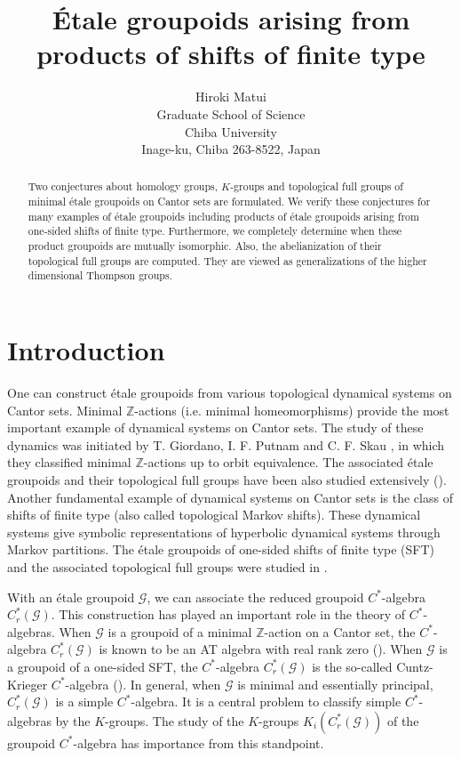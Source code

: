 \documentclass[11pt]{article}
\title{\'Etale groupoids arising from \\
products of shifts of finite type}
\author{Hiroki Matui \\
Graduate School of Science \\
Chiba University \\
Inage-ku, Chiba 263-8522, Japan}
\date{}
\theoremstyle{definition}
\numberwithin{equation}{section}
\newcommand{\G}{\mathcal{G}}
\newcommand{\Z}{\mathbb{Z}}
\begin{document}
\maketitle

\begin{abstract}
Two conjectures about homology groups, $K$-groups 
and topological full groups of minimal \'etale groupoids on Cantor sets 
are formulated. 
We verify these conjectures for many examples of \'etale groupoids 
including products of \'etale groupoids 
arising from one-sided shifts of finite type. 
Furthermore, 
we completely determine when these product groupoids are mutually isomorphic. 
Also, the abelianization of their topological full groups are computed. 
They are viewed as generalizations of the higher dimensional Thompson groups. 
\end{abstract}




\section{Introduction}

One can construct \'etale groupoids 
from various topological dynamical systems on Cantor sets. 
Minimal $\Z$-actions (i.e. minimal homeomorphisms) provide 
the most important example of dynamical systems on Cantor sets. 
The study of these dynamics was initiated 
by T. Giordano, I. F. Putnam and C. F. Skau \cite{GPS95crelle}, 
in which they classified minimal $\Z$-actions up to orbit equivalence. 
The associated \'etale groupoids and their topological full groups 
have been also studied extensively (\cite{GPS99Israel,M06IJM,JM13Ann}). 
Another fundamental example of dynamical systems on Cantor sets is 
the class of shifts of finite type (also called topological Markov shifts). 
These dynamical systems give 
symbolic representations of hyperbolic dynamical systems 
through Markov partitions. 
The \'etale groupoids of one-sided shifts of finite type (SFT) and 
the associated topological full groups were studied in \cite{M15crelle}. 

With an \'etale groupoid $\G$, 
we can associate the reduced groupoid $C^*$-algebra $C^*_r(\G)$. 
This construction has played 
an important role in the theory of $C^*$-algebras. 
When $\G$ is a groupoid of a minimal $\Z$-action on a Cantor set, 
the $C^*$-algebra $C^*_r(\G)$ is known to be an AT algebra with real rank zero 
(\cite{P90ETDS,GPS95crelle}). 
When $\G$ is a groupoid of a one-sided SFT, 
the $C^*$-algebra $C^*_r(\G)$ is the so-called Cuntz-Krieger $C^*$-algebra 
(\cite{CK80Invent}). 
In general, when $\G$ is minimal and essentially principal, 
$C^*_r(\G)$ is a simple $C^*$-algebra. 
It is a central problem to classify simple $C^*$-algebras by the $K$-groups. 
The study of the $K$-groups $K_i(C^*_r(\G))$ of the groupoid $C^*$-algebra 
has importance from this standpoint. 
\end{document}
